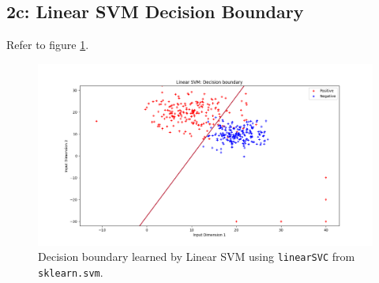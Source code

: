 \documentclass[a4paper,11pt]{article}
\begin{document}
\begin{mlsolution}
\subsection{2c: Linear SVM Decision Boundary}
Refer to figure \ref{svm2}.
\begin{figure}[!htb]
	\centering
	\includegraphics[scale=0.4]{linear_svm_binclassv2.png}
	\caption{Decision boundary learned by Linear SVM using \texttt{linearSVC} from \texttt{sklearn.svm}.}
	\label{svm2}
\end{figure}
\end{mlsolution}
\end{document}
